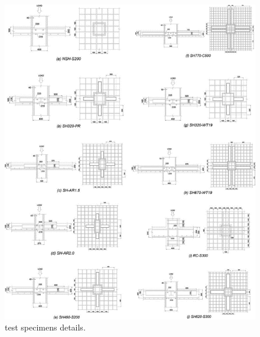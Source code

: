     \begin{figure}\centering
    \includegraphics[width=\columnwidth]{Figures/k2014f2.png}
    \caption{\cite{kim2014shearhead} test specimens details.}
    \label{k2014f2}
    \end{figure}

